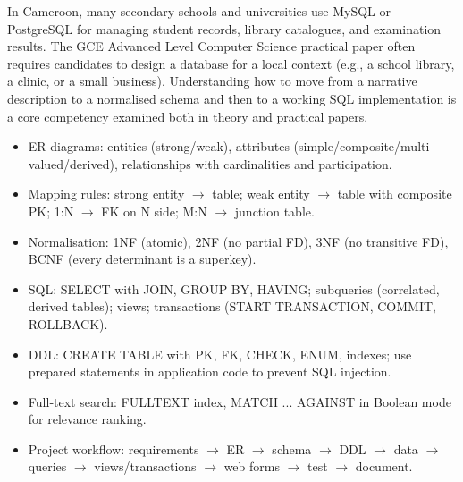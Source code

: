 \documentclass[11pt]{article}
\begin{document}
\begin{savaistu}
In Cameroon, many secondary schools and universities use MySQL or PostgreSQL for managing student records, library catalogues, and examination results. The GCE Advanced Level Computer Science practical paper often requires candidates to design a database for a local context (e.g., a school library, a clinic, or a small business). Understanding how to move from a narrative description to a normalised schema and then to a working SQL implementation is a core competency examined both in theory and practical papers.
\end{savaistu}

\begin{aretenir}
\begin{itemize}
\item ER diagrams: entities (strong/weak), attributes (simple/composite/multi-valued/derived), relationships with cardinalities and participation.
\item Mapping rules: strong entity $\rightarrow$ table; weak entity $\rightarrow$ table with composite PK; 1:N $\rightarrow$ FK on N side; M:N $\rightarrow$ junction table.
\item Normalisation: 1NF (atomic), 2NF (no partial FD), 3NF (no transitive FD), BCNF (every determinant is a superkey).
\item SQL: SELECT with JOIN, GROUP BY, HAVING; subqueries (correlated, derived tables); views; transactions (START TRANSACTION, COMMIT, ROLLBACK).
\item DDL: CREATE TABLE with PK, FK, CHECK, ENUM, indexes; use prepared statements in application code to prevent SQL injection.
\item Full‑text search: FULLTEXT index, MATCH ... AGAINST in Boolean mode for relevance ranking.
\item Project workflow: requirements $\rightarrow$ ER $\rightarrow$ schema $\rightarrow$ DDL $\rightarrow$ data $\rightarrow$ queries $\rightarrow$ views/transactions $\rightarrow$ web forms $\rightarrow$ test $\rightarrow$ document.
\end{itemize}
\end{aretenir}
\end{document}
